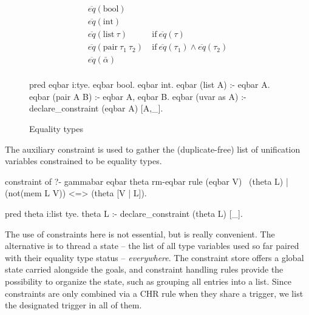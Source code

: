 \documentclass{these-ISSS}
\newenvironment{elpicode}
  {\VerbatimEnvironment\begin{elpibox}\begin{xelpicode}}{\end{xelpicode}
\end{elpibox}}
\begin{document}
\begin{figure}[!h]
\begin{minipage}{0.46\textwidth}
$$
\begin{array}{ll}
  \overline{eq}(\mbox{bool}) & \\
  \overline{eq}(\mbox{int}) & \\
  \overline{eq}(\mbox{list}~\tau) & ~\mbox{if}~ \overline{eq}(\tau) \\
  \overline{eq}(\mbox{pair}~\tau_1~\tau_2) & ~\mbox{if}~ \overline{eq}(\tau_1) \land \overline{eq}(\tau_2)\\
  \overline{eq}(\bar\alpha) & \\
\end{array}
$$
\end{minipage}
\begin{minipage}{0.58\textwidth}
\begin{elpicode}
pred eqbar i:tye.
eqbar bool.
eqbar int.
eqbar (list A) :- eqbar A.
eqbar (pair A B) :- eqbar A, eqbar B.
eqbar (uvar as A) :-
  declare_constraint (eqbar A) [A,_].
\end{elpicode}
\end{minipage}
\caption{Equality types\label{fig:eqbar}}
\end{figure}

\noindent
The auxiliary constraint  is used to gather the (duplicate-free)
list of unification variables constrained to be equality types.

\begin{elpicode}
constraint of ?- gammabar eqbar theta rm-eqbar {
  rule (eqbar V) \ (theta L) | (not(mem L V)) <=> (theta [V | L]).
}

pred theta i:list tye.
theta L :- declare_constraint (theta L) [_].
\end{elpicode}

The use of constraints here is not essential, but is really convenient.
The alternative is to thread a state -- the list of all type variables used
so far paired with their equality type status -- \emph{everywhere}.
The constraint store offers a global state carried
alongside the goals, and constraint handling rules provide the possibility to
organize the state, such as grouping all entries into a list. Since
constraints are only combined via a CHR rule when they share a trigger,
we list the designated trigger \elpi{_} in all of them.
\end{document}
